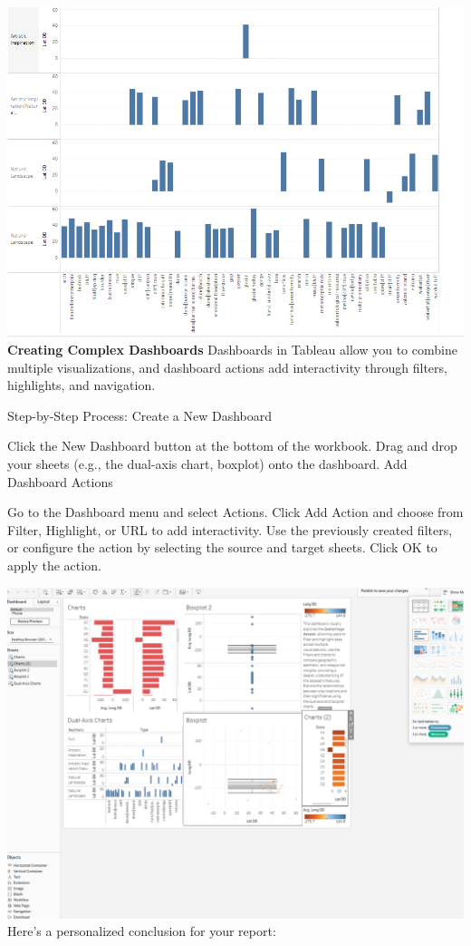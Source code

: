 \documentclass[
  letterpaper,
  DIV=11,
  numbers=noendperiod]{scrreprt}
\begin{document}
\includegraphics{Step3_DAC.png} \textbf{Creating Complex Dashboards}
Dashboards in Tableau allow you to combine multiple visualizations, and
dashboard actions add interactivity through filters, highlights, and
navigation.

Step-by-Step Process: Create a New Dashboard

Click the New Dashboard button at the bottom of the workbook. Drag and
drop your sheets (e.g., the dual-axis chart, boxplot) onto the
dashboard. Add Dashboard Actions

Go to the Dashboard menu and select Actions. Click Add Action and choose
from Filter, Highlight, or URL to add interactivity. Use the previously
created filters, or configure the action by selecting the source and
target sheets. Click OK to apply the action.

\includegraphics{dashboard.png} Here's a personalized conclusion for
your report:
\end{document}
